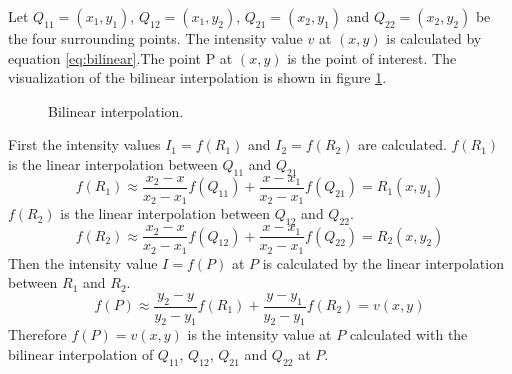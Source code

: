 Let $Q_{11}=(x_1,y_1)$, $Q_{12}=(x_1,y_2)$, $Q_{21}=(x_2,y_1)$ and $Q_{22}=(x_2,y_2)$ be the four surrounding points. The intensity value $v$ at $(x,y)$ is calculated by equation \ref{eq:bilinear}.The point P at $(x,y)$ is the point of interest. The visualization of the bilinear interpolation is shown in figure \ref{fig:blinearInterpolation}.
\begin{figure}[h]
    \centering

    \caption{Bilinear interpolation.}
    \label{fig:blinearInterpolation}
\end{figure}

First the intensity values $I_1 = f(R_1)$ and $I_2 = f(R_2)$ are calculated. $f(R_1)$ is the linear interpolation between $Q_{11}$ and $Q_{21}$
\begin{equation}
    f(R_{1}) \approx \frac{x_{2}-x}{x_{2}-x_{1}}f(Q_{11})+\frac{x-x_{1}}{x_{2}-x_{1}}f(Q_{21}) = R_{1}(x,y_{1})
\end{equation}
 $f(R_2)$ is the linear interpolation between $Q_{12}$ and $Q_{22}$.
 \begin{equation}
    f(R_{2}) \approx \frac{x_{2}-x}{x_{2}-x_{1}}f(Q_{12})+\frac{x-x_{1}}{x_{2}-x_{1}}f(Q_{22}) = R_{2}(x,y_{2})
\end{equation}
 Then the intensity value $I = f(P)$ at $P$ is calculated by the linear interpolation between $R_1$ and $R_2$. 
\begin{equation}
    f(P) \approx \frac{y_{2}-y}{y_{2}-y_{1}}f(R_{1})+ \frac{y-y_{1}}{y_{2}-y_{1}}f(R_{2}) = v(x,y)
\end{equation}
Therefore $f(P) = v(x,y)$ is the intensity value at $P$ calculated with the bilinear interpolation of $Q_{11}$, $Q_{12}$, $Q_{21}$ and $Q_{22}$ at $P$.



